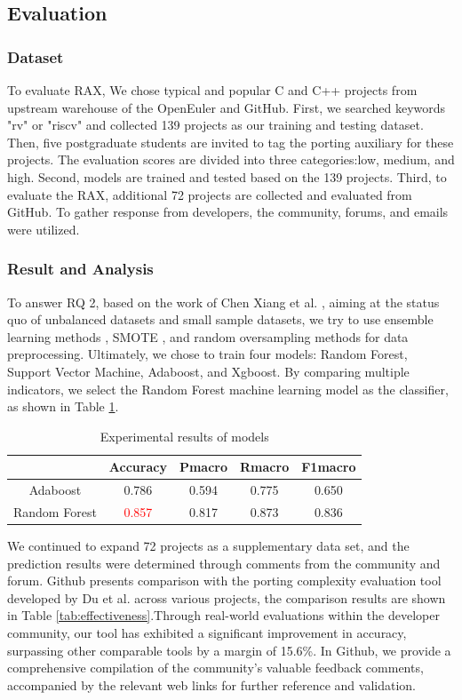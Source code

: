 \documentclass[sigconf,screen,review,anonymous]{acmart}
\begin{document}
\subsection{Evaluation}
\subsubsection{Dataset}
 To evaluate RAX, We chose typical and popular C and C++ projects from upstream warehouse of the OpenEuler and GitHub\citep{stage2023}. First, we searched keywords "rv" or "riscv" and collected 139 projects as our training and testing dataset. Then, five postgraduate students are invited to tag the porting auxiliary for these projects. The evaluation scores are divided into three categories:low, medium, and high\citep{githubss}. Second, models are trained and tested based on the 139 projects. Third, to evaluate the RAX, additional 72 projects are collected and evaluated from GitHub. To gather response from developers, the community, forums, and emails were utilized. 
\subsubsection{Result and Analysis}
To answer RQ 2, based on the work of Chen Xiang et al. \cite{5128907}, aiming at the status quo of unbalanced datasets and small sample datasets, we try to use ensemble learning methods \cite{6509481}, SMOTE \cite{4271036}, and random oversampling methods for data preprocessing.
Ultimately, we chose to train four models: Random Forest, Support Vector Machine, Adaboost, and Xgboost.
By comparing multiple indicators, we select the Random Forest machine learning model as the classifier, as shown in Table \ref{tab:evaluation}.

\begin{table}
  \caption{Experimental results of models}
  \label{tab:evaluation}
  \begin{tabular}{ccccc}
    \toprule
     & Accuracy & Pmacro & Rmacro & F1macro \\
    \midrule
    Adaboost & 0.786 & 0.594 & 0.775 & 0.650 \\
    Random Forest & \textcolor{red}{0.857} & 0.817 & 0.873 & 0.836 \\
  \bottomrule
\end{tabular}
\end{table}

We continued to expand 72 projects as a supplementary data set, and the prediction results were determined through comments from the community and forum.
Github presents comparison\cite{githubss} with the porting complexity evaluation tool developed by Du et al. across various projects, the comparison results are shown in Table \ref{tab:effectiveness}.Through real-world evaluations within the developer community, our tool has exhibited a significant improvement in accuracy, surpassing other comparable tools by a margin of 15.6\%. In Github, we provide a comprehensive compilation of the community's valuable feedback comments, accompanied by the relevant web links for further reference and validation.
\end{document}
